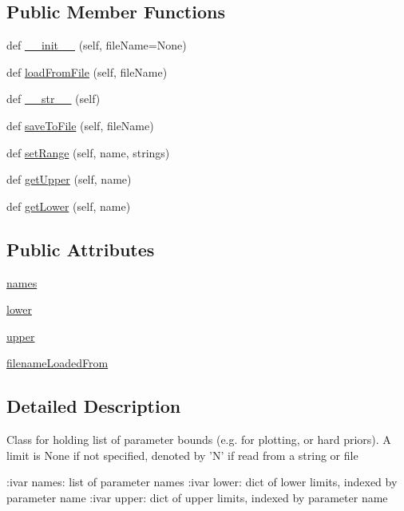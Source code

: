 \subsection*{Public Member Functions}
\begin{DoxyCompactItemize}
\item 
def \mbox{\hyperlink{classgetdist_1_1parampriors_1_1ParamBounds_a43df505fc2f7489a7f34095c8fed21d1}{\+\_\+\+\_\+init\+\_\+\+\_\+}} (self, file\+Name=None)
\item 
def \mbox{\hyperlink{classgetdist_1_1parampriors_1_1ParamBounds_af30cba6cd32f1bd0532c223b9eb8546b}{load\+From\+File}} (self, file\+Name)
\item 
def \mbox{\hyperlink{classgetdist_1_1parampriors_1_1ParamBounds_abeb92238dd9592bdc946de9c849f7275}{\+\_\+\+\_\+str\+\_\+\+\_\+}} (self)
\item 
def \mbox{\hyperlink{classgetdist_1_1parampriors_1_1ParamBounds_a25ade484ee4e41ac3e8bca11acad8a48}{save\+To\+File}} (self, file\+Name)
\item 
def \mbox{\hyperlink{classgetdist_1_1parampriors_1_1ParamBounds_aa3a528fdbc3800f5285a839de6339c0e}{set\+Range}} (self, name, strings)
\item 
def \mbox{\hyperlink{classgetdist_1_1parampriors_1_1ParamBounds_a9b653d54efcc1d19bebd8aa0a4cb2c9a}{get\+Upper}} (self, name)
\item 
def \mbox{\hyperlink{classgetdist_1_1parampriors_1_1ParamBounds_ad03ae510837b1fccf9ff40264b2c6e90}{get\+Lower}} (self, name)
\end{DoxyCompactItemize}
\subsection*{Public Attributes}
\begin{DoxyCompactItemize}
\item 
\mbox{\hyperlink{classgetdist_1_1parampriors_1_1ParamBounds_ad8019f4792977ca787a8e6aa897bce18}{names}}
\item 
\mbox{\hyperlink{classgetdist_1_1parampriors_1_1ParamBounds_ab0bb464918cd9910c1c82a662d67782c}{lower}}
\item 
\mbox{\hyperlink{classgetdist_1_1parampriors_1_1ParamBounds_a6ae31a9133ee64da00ee128feaf2a471}{upper}}
\item 
\mbox{\hyperlink{classgetdist_1_1parampriors_1_1ParamBounds_ac0e21ca4d3868b24d16433732140ca89}{filename\+Loaded\+From}}
\end{DoxyCompactItemize}


\subsection{Detailed Description}
\begin{DoxyVerb}Class for holding list of parameter bounds (e.g. for plotting, or hard priors). 
A limit is None if not specified, denoted by 'N' if read from a string or file

:ivar names: list of parameter names
:ivar lower: dict of lower limits, indexed by parameter name
:ivar upper: dict of upper limits, indexed by parameter name
\end{DoxyVerb}
 


